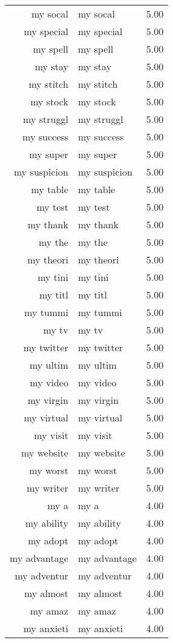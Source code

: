 \begin{table}[ht]
\begin{tabular}{rlr}
  my socal & my socal & 5.00 \\ 
  my special & my special & 5.00 \\ 
  my spell & my spell & 5.00 \\ 
  my stay & my stay & 5.00 \\ 
  my stitch & my stitch & 5.00 \\ 
  my stock & my stock & 5.00 \\ 
  my struggl & my struggl & 5.00 \\ 
  my success & my success & 5.00 \\ 
  my super & my super & 5.00 \\ 
  my suspicion & my suspicion & 5.00 \\ 
  my table & my table & 5.00 \\ 
  my test & my test & 5.00 \\ 
  my thank & my thank & 5.00 \\ 
  my the & my the & 5.00 \\ 
  my theori & my theori & 5.00 \\ 
  my tini & my tini & 5.00 \\ 
  my titl & my titl & 5.00 \\ 
  my tummi & my tummi & 5.00 \\ 
  my tv & my tv & 5.00 \\ 
  my twitter & my twitter & 5.00 \\ 
  my ultim & my ultim & 5.00 \\ 
  my video & my video & 5.00 \\ 
  my virgin & my virgin & 5.00 \\ 
  my virtual & my virtual & 5.00 \\ 
  my visit & my visit & 5.00 \\ 
  my website & my website & 5.00 \\ 
  my worst & my worst & 5.00 \\ 
  my writer & my writer & 5.00 \\ 
  my a & my a & 4.00 \\ 
  my ability & my ability & 4.00 \\ 
  my adopt & my adopt & 4.00 \\ 
  my advantage & my advantage & 4.00 \\ 
  my adventur & my adventur & 4.00 \\ 
  my almost & my almost & 4.00 \\ 
  my amaz & my amaz & 4.00 \\ 
  my anxieti & my anxieti & 4.00 \\ 

\end{tabular}
\end{table}

